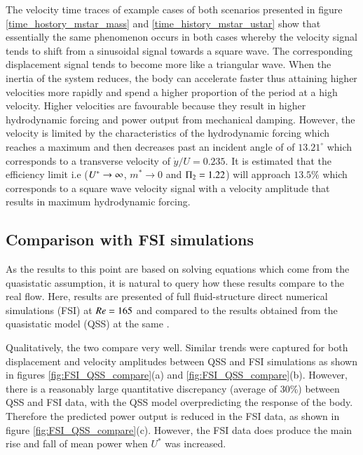 The velocity time traces of example cases of both scenarios presented in figure \ref{time_hostory_mstar_mass} and \ref{time_history_mstar_ustar} show that essentially the same phenomenon occurs in both cases whereby the velocity signal tends to shift from a sinusoidal signal towards a square wave. The corresponding displacement signal tends to become more like a triangular wave. When the inertia of the system reduces, the body can accelerate faster thus attaining higher velocities more rapidly and spend a higher proportion of the period at a high velocity. Higher velocities are favourable because they result in higher hydrodynamic forcing and power output from mechanical damping. However, the velocity is limited by the characteristics of the hydrodynamic forcing which reaches a maximum and then decreases past an incident angle of of $13.21^{\circ}$ which corresponds to a transverse velocity of $\dot{y}/U=0.235$. It is estimated that the efficiency limit i.e ($U^{*} \rightarrow \infty$, $m^* \rightarrow 0$ and $\Pi_2=1.22$) will approach $13.5\%$ which corresponds to a square wave velocity signal with a velocity amplitude that results in maximum  hydrodynamic forcing.







\subsection{Comparison with FSI simulations}
As the results to this point are based on solving equations which come from the quasistatic assumption, it is natural to query how these results compare to the real flow. Here, results are presented of full fluid-structure direct numerical simulations (FSI) at $Re=165$ and compared to the results obtained from the quasistatic model (QSS) at the same \reynoldsnumber.

Qualitatively, the two compare very well. Similar trends were captured for both displacement and velocity amplitudes between QSS and FSI simulations as shown in figures \ref{fig:FSI_QSS_compare}(a) and \ref{fig:FSI_QSS_compare}(b). However, there is a reasonably large quantitative discrepancy (average of $30\%$) between QSS and FSI data, with the QSS model overpredicting the response of the body. Therefore the predicted power output is reduced in the FSI data, as shown in figure \ref{fig:FSI_QSS_compare}(c). However, the FSI data does produce the main rise and fall of mean power when $U^*$ was increased.

